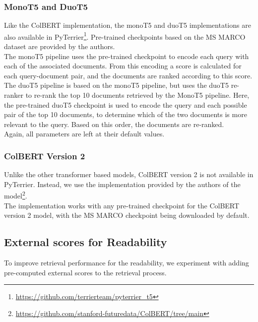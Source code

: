\subsubsection{MonoT5 and DuoT5}
Like the ColBERT implementation, the monoT5 and duoT5 implementations are also available in PyTerrier\footnote{\url{https://github.com/terrierteam/pyterrier_t5}}.
Pre-trained checkpoints based on the MS MARCO dataset are provided by the authors.
\\
The monoT5 pipeline uses the pre-trained checkpoint to encode each query with each of the associated documents.
From this encoding a score is calculated for each query-document pair, and the documents are ranked according to this score.
\\
The duoT5 pipeline is based on the monoT5 pipeline, but uses the duoT5 re-ranker to re-rank the top 10 documents retrieved by the MonoT5 pipeline.
Here, the pre-trained duoT5 checkpoint is used to encode the query and each possible pair of the top 10 documents, to determine which of the two documents is more relevant to the query.
Based on this order, the documents are re-ranked.
\\
Again, all parameters are left at their default values.

\subsubsection{ColBERT Version 2}
Unlike the other transformer based models, ColBERT version 2 is not available in PyTerrier.
Instead, we use the implementation provided by the authors of the model\footnote{\url{https://github.com/stanford-futuredata/ColBERT/tree/main}}.
\\
The implementation works with any pre-trained checkpoint for the ColBERT version 2 model, with the MS MARCO checkpoint being downloaded by default.

\subsection{External scores for Readability}\label{sec:external-scores}
To improve retrieval performance for the readability, we experiment with adding pre-computed external scores to the retrieval process.

